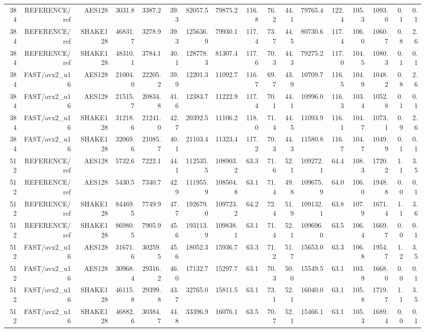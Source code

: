 \begin{table}[t]
\begin{tabular}{rrrrrrrrrrrrrrrrr}
384 & REFERENCE/ref & AES128 & 3031.8 & 3387.2 & 39.3 & 82057.5 & 79875.2 & 116.8 & 76.2 & 44.1 & 79765.4 & 122.4 & 105.3 & 1093.0 & 0.1 & 0.1 \\
384 & REFERENCE/ref & SHAKE128 & 46831.7 & 3278.9 & 39.3 & 125636.9 & 79930.1 & 117.4 & 73.7 & 44.5 & 80730.6 & 117.4 & 106.0 & 1060.7 & 0.8 & 2.6 \\
384 & REFERENCE/ref & SHAKE128 & 48310.1 & 3784.1 & 40.1 & 128778.3 & 81307.4 & 117.6 & 70.3 & 44.3 & 79275.2 & 117.0 & 104.5 & 1080.3 & 0.1 & 0.1 \\
384 & FAST/avx2_u16 & AES128 & 21004.0 & 22205.2 & 39.9 & 12201.3 & 11092.7 & 116.7 & 69.7 & 43.9 & 10709.7 & 116.5 & 104.9 & 1048.2 & 0.8 & 2.6 \\
384 & FAST/avx2_u16 & AES128 & 21515.7 & 20834.8 & 41.6 & 12383.7 & 11222.9 & 117.4 & 70.1 & 44.1 & 10996.0 & 116.3 & 103.4 & 1052.8 & 0.1 & 0.1 \\
384 & FAST/avx2_u16 & SHAKE128 & 31218.6 & 21241.0 & 42.7 & 20392.5 & 11106.2 & 118.0 & 71.4 & 44.5 & 11093.9 & 116.1 & 104.7 & 1073.1 & 0.9 & 2.6 \\
384 & FAST/avx2_u16 & SHAKE128 & 32069.6 & 21085.7 & 40.1 & 21103.4 & 11323.4 & 117.2 & 70.3 & 44.3 & 11580.8 & 116.7 & 104.7 & 1049.9 & 0.1 & 0.1 \\
512 & REFERENCE/ref & AES128 & 5732.6 & 7222.1 & 44.1 & 112535.5 & 108903.2 & 63.3 & 71.6 & 52.1 & 109272.1 & 64.4 & 108.3 & 1720.2 & 1.1 & 3.5 \\
512 & REFERENCE/ref & AES128 & 5430.5 & 7340.7 & 42.9 & 111955.9 & 108504.8 & 63.1 & 71.4 & 49.8 & 109675.9 & 64.0 & 106.0 & 1948.8 & 0.0 & 0.1 \\
512 & REFERENCE/ref & SHAKE128 & 84469.5 & 7749.9 & 47.7 & 192679.0 & 109723.2 & 64.2 & 72.4 & 51.9 & 109132.1 & 63.8 & 107.9 & 1671.4 & 1.1 & 3.6 \\
512 & REFERENCE/ref & SHAKE128 & 86980.5 & 7905.9 & 45.6 & 193113.9 & 109838.1 & 63.1 & 71.4 & 52.1 & 109696.0 & 63.5 & 106.4 & 1669.7 & 0.0 & 0.1 \\
512 & FAST/avx2_u16 & AES128 & 31671.6 & 30259.5 & 45.6 & 18052.3 & 15936.7 & 63.3 & 71.2 & 51.7 & 15653.0 & 63.3 & 106.8 & 1954.7 & 1.2 & 3.5 \\
512 & FAST/avx2_u16 & AES128 & 30968.4 & 29316.2 & 46.0 & 17132.7 & 15297.7 & 63.1 & 70.3 & 50.0 & 15549.5 & 63.1 & 103.9 & 1668.0 & 0.0 & 0.1 \\
512 & FAST/avx2_u16 & SHAKE128 & 46115.8 & 29399.8 & 43.7 & 32765.0 & 15811.5 & 63.1 & 73.1 & 52.1 & 16040.0 & 63.1 & 105.8 & 1719.7 & 1.1 & 3.5 \\
512 & FAST/avx2_u16 & SHAKE128 & 46882.6 & 30384.7 & 44.8 & 33396.9 & 16076.1 & 63.5 & 70.7 & 52.1 & 15466.1 & 63.1 & 105.3 & 1689.4 & 0.0 & 0.1 \\
\bottomrule
\end{tabular}
\end{table}
